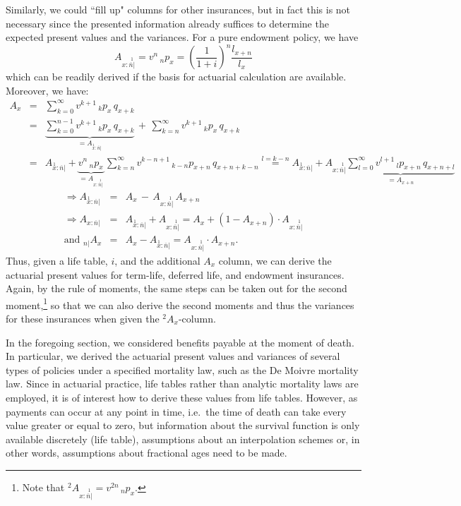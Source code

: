 \documentclass[11pt,fleqn,oneside]{book}
\begin{document}
Similarly, we could ``fill up" columns for other insurances, but in fact this is not necessary since the presented information already suffices to determine the expected present values and the variances. For a pure endowment policy, we have
$$
{A_{x:\stackrel{1}{\overline{n}|}}} = v^n \, {_np_x} = \left(\frac{1}{1+i}\right)^n \frac{l_{x+n}}{l_x}
$$
which can be readily derived if the basis for actuarial calculation are available. Moreover, we have:
\begin{eqnarray*}
A_x &=& \sum_{k=0}^\infty v^{k+1}\,{_kp_x}\,q_{x+k}\\
&=& \underbrace{\sum_{k=0}^{n-1}v^{k+1}\,{_kp_x}\,q_{x+k}}_{={A_{\stackrel{1}{x}:\overline{n}|}}} \,+\, \sum_{k=n}^\infty v^{k+1}\,{_kp_x}\,q_{x+k} \\
&=& {A_{\stackrel{1}{x}:\overline{n}|}} + \underbrace{{v^n}\,{_np_x}}_{= A_{x:\stackrel{1}{\overline{n}|}}}\,\sum_{k=n}^\infty v^{k-n+1}\,{_{k-n}p_{x+n}}\,q_{x+n+k-n} 
\stackrel{l=k-n}{=} {A_{\stackrel{1}{x}:\overline{n}|}} + {A_{x:\stackrel{1}{\overline{n}|}}}
\underbrace{\sum_{l=0}^\infty v^{l+1}\,{_lp_{x+n}}\,q_{x+n+l}}_{=A_{x+n}}
\end{eqnarray*}
\begin{eqnarray*}
\Rightarrow  {A_{\stackrel{1}{x}:\overline{n}|}} &=& A_x\,-\, {A_{x:\stackrel{1}{\overline{n}|}}}\,
A_{x+n}\\
\Rightarrow
{A_{x:\overline{n}|}} &=& {A_{\stackrel{1}{x}:\overline{n}|}} + {A_{x:\stackrel{1}{\overline{n}|}}} = A_x + (1-A_{x+n})\cdot {A_{x:\stackrel{1}{\overline{n}|}}} \\
\text{and }{_{n|}A_x} &=& A_x - {A_{\stackrel{1}{x}:\overline{n}|}} = {A_{x:\stackrel{1}{\overline{n}|}}} \cdot A_{x+n}.
\end{eqnarray*}
Thus, given a life table, $i$, and the additional $A_x$ column, we can derive the actuarial present values for term-life, deferred life, and endowment insurances. Again, by the rule of moments, the same steps can be taken out for the second moment,\footnote{Note that ${^2A_{x:\stackrel{1}{\overline{n}|}}} = v^{2n} \, {_np_x}$.} so that we can also derive the second moments and thus the variances for these insurances when given the $^2A_x$-column.

In the foregoing section, we considered benefits payable at the moment of death. In particular, we derived the actuarial present values and variances of several types of policies under a specified mortality law, such as the De Moivre mortality law. Since in actuarial practice, life tables rather than analytic mortality laws are employed, it is of interest how to derive these values from life tables. However, as payments can occur at any point in time, i.e.\ the time of death can take every value greater or equal to zero, but information about the survival function is only available discretely (life table), assumptions about an interpolation schemes or, in other words, assumptions about fractional ages need to be made.
\end{document}
